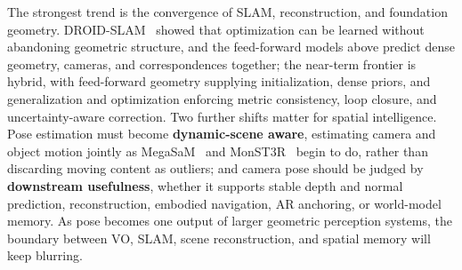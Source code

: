 The strongest trend is the convergence of SLAM, reconstruction, and foundation geometry. DROID-SLAM~\cite{teed2021droid} showed that optimization can be learned without abandoning geometric structure, and the feed-forward models above predict dense geometry, cameras, and correspondences together; the near-term frontier is hybrid, with feed-forward geometry supplying initialization, dense priors, and generalization and optimization enforcing metric consistency, loop closure, and uncertainty-aware correction.
Two further shifts matter for spatial intelligence. Pose estimation must become \textbf{dynamic-scene aware}, estimating camera and object motion jointly as MegaSaM~\cite{li2025megasam} and MonST3R~\cite{monst3r} begin to do, rather than discarding moving content as outliers; and camera pose should be judged by \textbf{downstream usefulness}, whether it supports stable depth and normal prediction, reconstruction, embodied navigation, AR anchoring, or world-model memory. As pose becomes one output of larger geometric perception systems, the boundary between VO, SLAM, scene reconstruction, and spatial memory will keep blurring.
